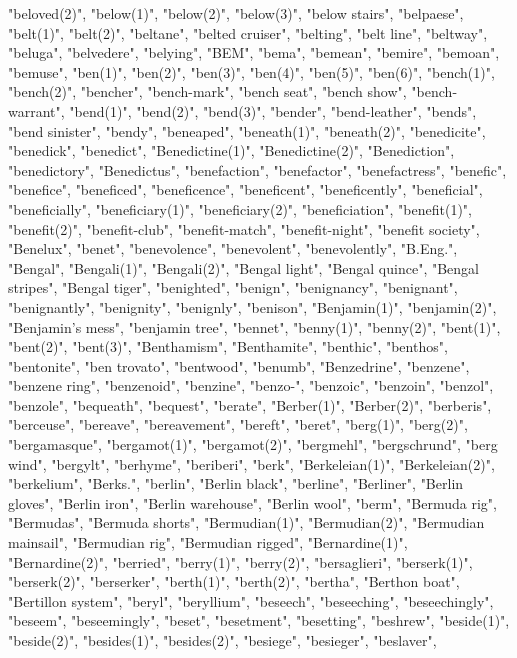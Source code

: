 "beloved(2)",
"below(1)",
"below(2)",
"below(3)",
"below stairs",
"belpaese",
"belt(1)",
"belt(2)",
"beltane",
"belted cruiser",
"belting",
"belt line",
"beltway",
"beluga",
"belvedere",
"belying",
"BEM",
"bema",
"bemean",
"bemire",
"bemoan",
"bemuse",
"ben(1)",
"ben(2)",
"ben(3)",
"ben(4)",
"ben(5)",
"ben(6)",
"bench(1)",
"bench(2)",
"bencher",
"bench-mark",
"bench seat",
"bench show",
"bench-warrant",
"bend(1)",
"bend(2)",
"bend(3)",
"bender",
"bend-leather",
"bends",
"bend sinister",
"bendy",
"beneaped",
"beneath(1)",
"beneath(2)",
"benedicite",
"benedick",
"benedict",
"Benedictine(1)",
"Benedictine(2)",
"Benediction",
"benedictory",
"Benedictus",
"benefaction",
"benefactor",
"benefactress",
"benefic",
"benefice",
"beneficed",
"beneficence",
"beneficent",
"beneficently",
"beneficial",
"beneficially",
"beneficiary(1)",
"beneficiary(2)",
"beneficiation",
"benefit(1)",
"benefit(2)",
"benefit-club",
"benefit-match",
"benefit-night",
"benefit society",
"Benelux",
"benet",
"benevolence",
"benevolent",
"benevolently",
"B.Eng.",
"Bengal",
"Bengali(1)",
"Bengali(2)",
"Bengal light",
"Bengal quince",
"Bengal stripes",
"Bengal tiger",
"benighted",
"benign",
"benignancy",
"benignant",
"benignantly",
"benignity",
"benignly",
"benison",
"Benjamin(1)",
"benjamin(2)",
"Benjamin's mess",
"benjamin tree",
"bennet",
"benny(1)",
"benny(2)",
"bent(1)",
"bent(2)",
"bent(3)",
"Benthamism",
"Benthamite",
"benthic",
"benthos",
"bentonite",
"ben trovato",
"bentwood",
"benumb",
"Benzedrine",
"benzene",
"benzene ring",
"benzenoid",
"benzine",
"benzo-",
"benzoic",
"benzoin",
"benzol",
"benzole",
"bequeath",
"bequest",
"berate",
"Berber(1)",
"Berber(2)",
"berberis",
"berceuse",
"bereave",
"bereavement",
"bereft",
"beret",
"berg(1)",
"berg(2)",
"bergamasque",
"bergamot(1)",
"bergamot(2)",
"bergmehl",
"bergschrund",
"berg wind",
"bergylt",
"berhyme",
"beriberi",
"berk",
"Berkeleian(1)",
"Berkeleian(2)",
"berkelium",
"Berks.",
"berlin",
"Berlin black",
"berline",
"Berliner",
"Berlin gloves",
"Berlin iron",
"Berlin warehouse",
"Berlin wool",
"berm",
"Bermuda rig",
"Bermudas",
"Bermuda shorts",
"Bermudian(1)",
"Bermudian(2)",
"Bermudian mainsail",
"Bermudian rig",
"Bermudian rigged",
"Bernardine(1)",
"Bernardine(2)",
"berried",
"berry(1)",
"berry(2)",
"bersaglieri",
"berserk(1)",
"berserk(2)",
"berserker",
"berth(1)",
"berth(2)",
"bertha",
"Berthon boat",
"Bertillon system",
"beryl",
"beryllium",
"beseech",
"beseeching",
"beseechingly",
"beseem",
"beseemingly",
"beset",
"besetment",
"besetting",
"beshrew",
"beside(1)",
"beside(2)",
"besides(1)",
"besides(2)",
"besiege",
"besieger",
"beslaver",
